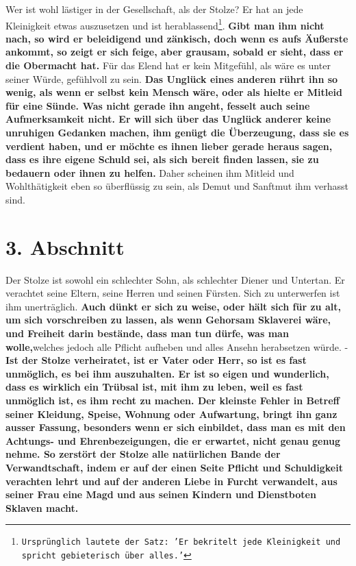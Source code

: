 Wer ist wohl lästiger in der Gesellschaft, als der Stolze?
Er hat an jede Kleinigkeit etwas auszusetzen und ist
herablassend\footnote{\texttt{Ursprünglich lautete der Satz: 'Er bekritelt jede
Kleinigkeit und spricht gebieterisch über alles.'}}.
\label{ref:12_02_eitle_menschen_streit}
\textbf{Gibt man ihm nicht nach,
so wird er beleidigend und zänkisch, doch wenn es aufs Äußerste ankommt, so
zeigt
er sich feige, aber grausam, sobald er sieht, dass er die
Obermacht hat.} Für das
Elend hat er kein Mitgefühl, als wäre es unter seiner
Würde, gefühlvoll zu sein. \label{ref:12_02_eitle_menschen_mitgefuehl}
\textbf{Das Unglück eines anderen rührt ihn so wenig, als wenn er selbst kein
Mensch
wäre, oder als hielte er Mitleid für eine Sünde. Was nicht gerade
ihn angeht,
fesselt auch seine Aufmerksamkeit nicht. Er will sich über das Unglück anderer
keine unruhigen Gedanken machen, ihm genügt die Überzeugung, dass sie es
verdient haben, und er möchte es ihnen lieber gerade heraus sagen, dass es ihre
eigene Schuld sei, als sich bereit finden lassen, sie zu bedauern
oder ihnen zu
helfen.} Daher scheinen ihm Mitleid und Wohlthätigkeit eben so
überflüssig zu
sein, als Demut und Sanftmut ihm verhasst sind.

\section{3. Abschnitt} \label{kap12_ab3}

Der Stolze ist sowohl ein schlechter Sohn, als schlechter
Diener und Untertan.
Er verachtet seine Eltern, seine Herren und seinen
Fürsten. Sich
zu unterwerfen
ist ihm unerträglich. \label{ref:12_03_eitle_menschen_ehe}
\textbf{Auch dünkt er sich zu weise, oder hält sich für zu alt, um
sich vorschreiben zu lassen, als wenn Gehorsam Sklaverei
 wäre,
und Freiheit
darin bestände, dass man tun dürfe, was man wolle,}welches jedoch alle Pflicht
aufheben und alles Ansehn herabsetzen würde. - \textbf{Ist der Stolze
verheiratet, ist
er Vater oder Herr, so ist es fast unmöglich, es bei ihm auszuhalten. Er ist so
eigen und wunderlich, dass es wirklich ein Trübsal ist, mit ihm zu leben, weil
es fast unmöglich ist, es ihm recht zu machen. Der kleinste Fehler in Betreff
seiner Kleidung, Speise, Wohnung oder Aufwartung, bringt ihn ganz ausser
Fassung,
besonders wenn er sich einbildet, dass man es mit den Achtungs- und
Ehrenbezeigungen, die er erwartet, nicht genau genug nehme. So zerstört der
Stolze alle natürlichen Bande der Verwandtschaft, indem er
auf der einen Seite
Pflicht und Schuldigkeit verachten lehrt und auf der anderen
Liebe in Furcht
verwandelt, aus seiner Frau eine Magd und aus seinen
Kindern und Dienstboten
Sklaven macht.}

